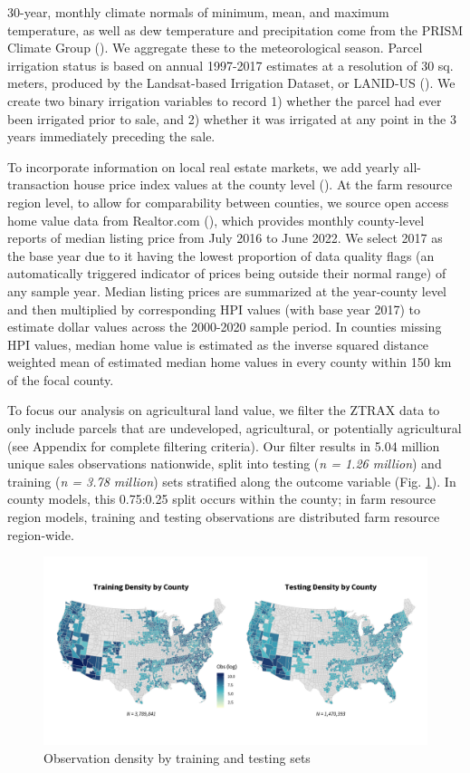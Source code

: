 \documentclass[12pt]{article}
\begin{document}
30-year, monthly climate normals of minimum, mean, and maximum temperature, as well as dew temperature and precipitation come from the PRISM Climate Group (\cite{PRISMClimate2021}). We aggregate these to the meteorological season. Parcel irrigation status is based on annual 1997-2017 estimates at a resolution of 30 sq. meters, produced by the Landsat-based Irrigation Dataset, or LANID-US (\cite{Xie2021MappingStates}). We create two binary irrigation variables to record 1) whether the parcel had ever been irrigated prior to sale, and 2) whether it was irrigated at any point in the 3 years immediately preceding the sale. 

To incorporate information on local real estate markets, we add yearly all-transaction house price index values at the county level (\cite{FederalHousing2022}). At the farm resource region level, to allow for comparability between counties, we source open access home value data from Realtor.com (\cite{RealtorData}), which provides monthly county-level reports of median listing price from July 2016 to June 2022. We select 2017 as the base year due to it having the lowest proportion of data quality flags (an automatically triggered indicator of prices being outside their normal range) of any sample year. Median listing prices are summarized at the year-county level and then multiplied by corresponding HPI values (with base year 2017) to estimate dollar values across the 2000-2020 sample period. In counties missing HPI values, median home value is estimated as the inverse squared distance weighted mean of estimated median home values in every county within 150 km of the focal county. 

To focus our analysis on agricultural land value, we filter the ZTRAX data to only include parcels that are undeveloped, agricultural, or potentially agricultural (see Appendix for complete filtering criteria).
Our filter results in 5.04 million unique sales observations nationwide, split into testing (\textit{n = 1.26 million}) and training (\textit{n = 3.78 million}) sets stratified along the outcome variable (Fig. \ref{fig:train_test}). In county models, this 0.75:0.25 split occurs within the county; in farm resource region models, training and testing observations are distributed farm resource region-wide. 

\begin{figure}
    \centering
    \includegraphics[width=1\textwidth]{archive/figures/test_train_density.png}
    \caption{Observation density by training and testing sets}
    \label{fig:train_test}
\end{figure}
\end{document}
